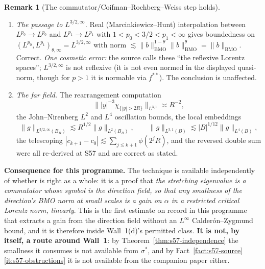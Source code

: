 \documentclass[11pt]{article}
\theoremstyle{definition}
\newtheorem{remark}[theorem]{Remark}
\theoremstyle{remark}
\begin{document}
\begin{remark}[The commutator/Coifman--Rochberg--Weiss step holds]
\begin{enumerate}[label=\textup{(\arabic*)},leftmargin=2.6em]
    $\|[b,R_j]\|_{L^p\to L^p}\leq C_p\|b\|_{\mathrm{BMO}}$,
    $1<p<\infty$. The operator needed here is a composition of two Riesz
    transforms, and $[R_iR_j,b]=R_i[R_j,b]+[R_i,b]R_j$, so the bound transfers
    with the same linear dependence on $\|b\|_{\mathrm{BMO}}$ \emph{without}
    invoking any general Calder\'on--Zygmund version. The vector-valued
    bookkeeping is componentwise. Correct.
  \item \emph{The passage to $L^{3/2,\infty}$.} Real (Marcinkiewicz--Hunt)
    interpolation \cite{Hunt1966} between $L^{p_0}\to L^{p_0}$ and
    $L^{p_1}\to L^{p_1}$ with $1<p_0<3/2<p_1<\infty$ gives boundedness on
    $(L^{p_0},L^{p_1})_{\theta,\infty}=L^{3/2,\infty}$ with norm
    $\lesssim\|b\|_{\mathrm{BMO}}^{1-\theta}\|b\|_{\mathrm{BMO}}^{\theta}
    =\|b\|_{\mathrm{BMO}}$. Correct. \emph{One cosmetic error:} the source
    calls these ``the reflexive Lorentz spaces''; $L^{3/2,\infty}$ is not
    reflexive (it is not even normed in the displayed quasi-norm, though for
    $p>1$ it is normable via $f^{**}$). The conclusion is unaffected.
  \item \emph{The far field.} The rearrangement computation
    \[
      \bigl\||y|^{-3}\chi_{\{|y|>2R\}}\bigr\|_{L^{3,1}}\asymp R^{-2},
    \]
    the John--Nirenberg $L^2$ and $L^4$ oscillation bounds, the local
    embeddings
    \[
      \|g\|_{L^{3/2,\infty}(B_R)}\lesssim R^{1/2}\|g\|_{L^2(B_R)},
      \qquad
      \|g\|_{L^{3,1}(B)}\lesssim|B|^{1/12}\|g\|_{L^4(B)},
    \]
    the telescoping
    $|c_{k+1}-c_0|\lesssim\sum_{j\leq k+1}\phi(2^jR)$, and the reversed
    double sum were all re-derived at S57 and are correct as stated.
  \end{enumerate}
  \textbf{Consequence for this programme.} The technique is available
  independently of whether \cite{Grujic2026Log} is right as a whole: it is a
  proof that \emph{the stretching eigenvalue is a commutator whose symbol is
  the direction field, so that any smallness of the direction's BMO norm at
  small scales is a gain on $\alpha$ in a restricted critical Lorentz norm,
  linearly}. This is the first estimate on record in this programme that
  extracts a gain from the direction field without an $L^\infty$
  Calder\'on--Zygmund bound, and it is therefore inside Wall~1(d)'s permitted
  class. \textbf{It is not, by itself, a route around Wall~1}: by
  Theorem~\ref{thm:s57-independence} the smallness it consumes is not
  available from $\sigma^*$, and by
  Fact~\ref{fact:s57-source}\ref{it:s57-obstructions} it is not available from
  the companion paper either.
\end{remark}
\end{document}
